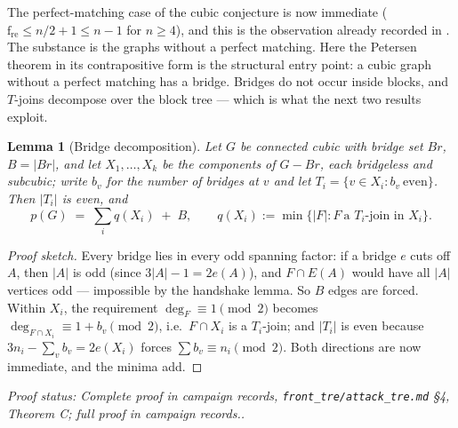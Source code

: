 \documentclass[a4paper,11pt]{amsart}
\newtheorem{lemma}[theorem]{Lemma}
\theoremstyle{definition}
\theoremstyle{remark}
\newcommand{\fre}{\operatorname{f_{re}}}
\newcommand{\proofsrc}[1]{\par\smallskip\noindent\begin{sloppypar}\small\emph{Proof status: #1.}\end{sloppypar}\par\smallskip}
\begin{document}
The perfect-matching case of the cubic conjecture is now immediate ($\fre\le n/2+1\le n-1$ for $n\ge4$),
and this is the observation already recorded in \cite{AABC25}. The substance is the graphs without a
perfect matching. Here the Petersen theorem in its contrapositive form is the structural entry point: a
cubic graph without a perfect matching has a bridge. Bridges do not occur inside blocks, and $T$-joins
decompose over the block tree --- which is what the next two results exploit.

\begin{lemma}[Bridge decomposition]\label{lem:bridgedecomp}
Let $G$ be connected cubic with bridge set $Br$, $B=|Br|$, and let $X_1,\dots,X_k$ be the components of
$G-Br$, each bridgeless and subcubic; write $b_v$ for the number of bridges at $v$ and let
$T_i=\{v\in X_i: b_v\ \mathrm{even}\}$. Then $|T_i|$ is even, and
\[
p(G)\;=\;\sum_i q(X_i)\;+\;B,\qquad q(X_i):=\min\{|F|:F\ \text{a $T_i$-join in $X_i$}\}.
\]
\end{lemma}
\begin{proof}[Proof sketch]
Every bridge lies in every odd spanning factor: if a bridge $e$ cuts off $A$, then $|A|$ is odd
(since $3|A|-1=2e(A)$), and $F\cap E(A)$ would have all $|A|$ vertices odd --- impossible by the handshake
lemma. So $B$ edges are forced. Within $X_i$, the requirement $\deg_F\equiv1\pmod2$ becomes
$\deg_{F\cap X_i}\equiv1+b_v\pmod2$, i.e.\ $F\cap X_i$ is a $T_i$-join; and $|T_i|$ is even because
$3n_i-\sum_v b_v=2e(X_i)$ forces $\sum b_v\equiv n_i\pmod2$. Both directions are now immediate, and the
minima add.
\end{proof}
\proofsrc{Complete proof in campaign records, \texttt{front\_tre/attack\_tre.md} \S4, Theorem C; full proof
in campaign records.}
\end{document}
